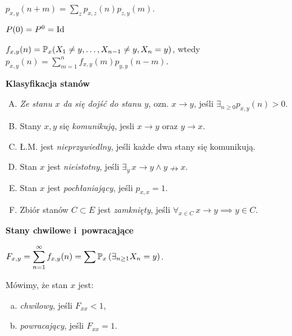 	\begin{remark}
		$p_{x,y}(n+m) = \sum_z p_{x,z}(n) p_{z,y}(m)$.
	\end{remark}
	
	\begin{remark}
		$P(0) = P^0 = \mr{Id}$
	\end{remark}
	
	\begin{remark}
		$f_{x,y}(n) = \P_x(X_1 \neq y, \ldots, X_{n-1} \neq y, X_n = y)$,
		wtedy $p_{x,y}(n) = \sum_{m=1}^n f_{x,y}(m) p_{y,y}(n-m)$.
	\end{remark}
	
	\pagebreak
	
	{\bf Klasyfikacja stanów}
	\begin{definition}
		\begin{enumerate}[A.]
			\item \emph{Ze stanu $x$ da się dojść do stanu $y$},
			ozn. $x \to y$, jeśli $\exists_{n \geq 0} p_{x,y}(n) > 0$.
			\item Stany $x, y$ się \emph{komunikują},
			jesli $x \to y$ oraz $y \to x$.
			\item Ł.M. jest \emph{nieprzywiedlny}, 
			jeśli każde dwa stany się komunikują.
			\item Stan $x$ jest \emph{nieistotny}, jeśli
			$\exists_y\, x \to y \wedge y \nrightarrow x$.
			\item Stan $x$ jest \emph{pochłaniający}, jeśli
			$p_{x,x} = 1$.
			\item Zbiór stanów $C \subset E$ jest \emph{zamknięty},
			jeśli $\forall_{x \in C}\, x \to y \implies y \in C$.
		\end{enumerate}

	\end{definition}
	
	{\bf Stany chwilowe i~powracające}
	\begin{definition}
		$\displaystyle F_{x,y} = \sum_{n=1}^\infty f_{x,y}(n) 
		= \sum \P_x\left( \exists_{n \geq 1} X_n=y \right)$.
	\end{definition}
	
	\begin{definition}
		Mówimy, że stan $x$ jest:
		\begin{enumerate}[a)]
			\item \emph{chwilowy}, jeśli $F_{xx} < 1$,
			\item \emph{powracający}, jeśli $F_{xx} = 1$.
		\end{enumerate}

	\end{definition}
	
